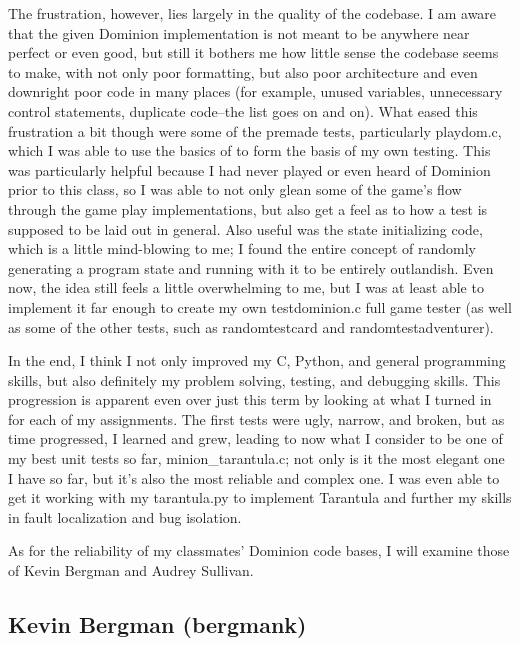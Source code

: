 \documentclass[letterpaper,10pt,fleqn]{article}
\numberwithin{equation}{section}
\begin{document}
The frustration, however, lies largely in the quality of the codebase.  I am aware that the given Dominion implementation is not meant to be anywhere near perfect or even good, but still it bothers me how little sense the codebase seems to make, with not only poor formatting, but also poor architecture and even downright poor code in many places (for example, unused variables, unnecessary control statements, duplicate code--the list goes on and on).  What eased this frustration a bit though were some of the premade tests, particularly playdom.c, which I was able to use the basics of to form the basis of my own testing.  This was particularly helpful because I had never played or even heard of Dominion prior to this class, so I was able to not only glean some of the game's flow through the game play implementations, but also get a feel as to how a test is supposed to be laid out in general.  Also useful was the state initializing code, which is a little mind-blowing to me; I found the entire concept of randomly generating a program state and running with it to be entirely outlandish.  Even now, the idea still feels a little overwhelming to me, but I was at least able to implement it far enough to create my own testdominion.c full game tester (as well as some of the other tests, such as randomtestcard and randomtestadventurer).

In the end, I think I not only improved my C, Python, and general programming skills, but also definitely my problem solving, testing, and debugging skills.  This progression is apparent even over just this term by looking at what I turned in for each of my assignments.  The first tests were ugly, narrow, and broken, but as time progressed, I learned and grew, leading to now what I consider to be one of my best unit tests so far, minion\_tarantula.c; not only is it the most elegant one I have so far, but it's also the most reliable and complex one.  I was even able to get it working with my tarantula.py to implement Tarantula and further my skills in fault localization and bug isolation.

As for the reliability of my classmates' Dominion code bases, I will examine those of Kevin Bergman and Audrey Sullivan.

\subsection*{Kevin Bergman (bergmank)}
\end{document}
